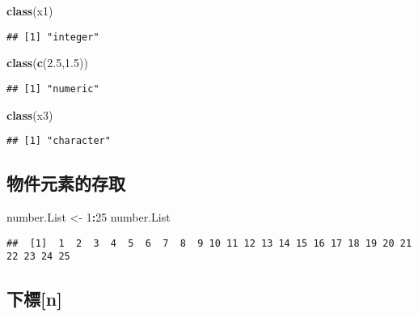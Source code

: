 \documentclass[]{article}
\newenvironment{Shaded}{\begin{snugshade}}{\end{snugshade}}
\newcommand{\DecValTok}[1]{\textcolor[rgb]{0.00,0.00,0.81}{#1}}
\newcommand{\FloatTok}[1]{\textcolor[rgb]{0.00,0.00,0.81}{#1}}
\newcommand{\KeywordTok}[1]{\textcolor[rgb]{0.13,0.29,0.53}{\textbf{#1}}}
\newcommand{\NormalTok}[1]{#1}
\newcommand{\OperatorTok}[1]{\textcolor[rgb]{0.81,0.36,0.00}{\textbf{#1}}}
\newcommand{\StringTok}[1]{\textcolor[rgb]{0.31,0.60,0.02}{#1}}
\begin{document}
\begin{Shaded}
\begin{Highlighting}[]
\KeywordTok{class}\NormalTok{(x1)}
\end{Highlighting}
\end{Shaded}

\begin{verbatim}
## [1] "integer"
\end{verbatim}

\begin{Shaded}
\begin{Highlighting}[]
\KeywordTok{class}\NormalTok{(}\KeywordTok{c}\NormalTok{(}\FloatTok{2.5}\NormalTok{,}\FloatTok{1.5}\NormalTok{))}
\end{Highlighting}
\end{Shaded}

\begin{verbatim}
## [1] "numeric"
\end{verbatim}

\begin{Shaded}
\begin{Highlighting}[]
\KeywordTok{class}\NormalTok{(x3)}
\end{Highlighting}
\end{Shaded}

\begin{verbatim}
## [1] "character"
\end{verbatim}

\hypertarget{ux7269ux4ef6ux5143ux7d20ux7684ux5b58ux53d6}{%
\subsection{物件元素的存取}\label{ux7269ux4ef6ux5143ux7d20ux7684ux5b58ux53d6}}

\begin{Shaded}
\begin{Highlighting}[]
\NormalTok{number.List <-}\StringTok{ }\DecValTok{1}\OperatorTok{:}\DecValTok{25}
\NormalTok{number.List}
\end{Highlighting}
\end{Shaded}

\begin{verbatim}
##  [1]  1  2  3  4  5  6  7  8  9 10 11 12 13 14 15 16 17 18 19 20 21 22 23 24 25
\end{verbatim}

\hypertarget{ux4e0bux6a19n}{%
\subsection{下標{[}n{]}}\label{ux4e0bux6a19n}}
\end{document}
